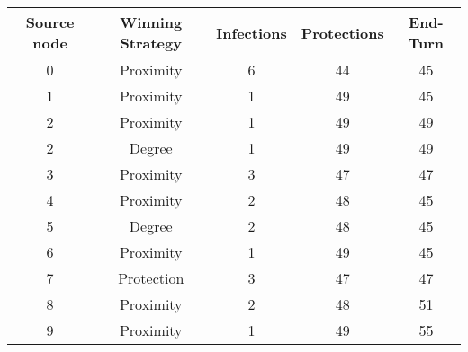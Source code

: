 \documentclass[results.tex]{subfiles}
\begin{document}
    \begin{center}
        \begin{tabular}{| c || c | c | c | c |}
            \hline
            {\bfseries Source node} & {\bfseries Winning Strategy} & {\bfseries Infections} & {\bfseries Protections}
            & {\bfseries End-Turn}
            \\  %
            \hline\hline
            0                       & Proximity                    & 6                      & 44                      & 45                   \\
            \hline
            1                       & Proximity                    & 1                      & 49                      & 45                   \\
            \hline
            2                       & Proximity                    & 1                      & 49                      & 49                   \\
            \hline
            2                       & Degree                       & 1                      & 49                      & 49                   \\
            \hline
            3                       & Proximity                    & 3                      & 47                      & 47                   \\
            \hline
            4                       & Proximity                    & 2                      & 48                      & 45                   \\
            \hline
            5                       & Degree                       & 2                      & 48                      & 45                   \\
            \hline
            6                       & Proximity                    & 1                      & 49                      & 45                   \\
            \hline
            7                       & Protection                   & 3                      & 47                      & 47                   \\
            \hline
            8                       & Proximity                    & 2                      & 48                      & 51                   \\
            \hline
            9                       & Proximity                    & 1                      & 49                      & 55                   \\

\end{tabular}
\end{center}
\end{document}
